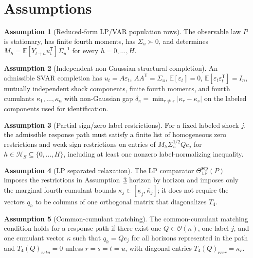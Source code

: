 \documentclass[11pt]{article}
\newcommand{\E}{\mathbb{E}}
\newcommand{\transpose}{\mathsf{T}}
\theoremstyle{definition}
\newtheorem{assumption}{Assumption}
\theoremstyle{plain}
\theoremstyle{remark}
\begin{document}
\section{Assumptions}
\begin{assumption}[Reduced-form LP/VAR population rows]\label{ass:rf-rows}
The observable law \(P\) is stationary, has finite fourth moments, has \(\Sigma_u\succ0\), and determines \(M_h=\E[Y_{t+h}u_t^\transpose]\Sigma_u^{-1}\) for every \(h=0,\ldots,H\).
\end{assumption}

\begin{assumption}[Independent non-Gaussian structural completion]\label{ass:ng-completion}
An admissible SVAR completion has \(u_t=A\varepsilon_t\), \(AA^\transpose=\Sigma_u\), \(\E[\varepsilon_t]=0\), \(\E[\varepsilon_t\varepsilon_t^\transpose]=I_n\), mutually independent shock components, finite fourth moments, and fourth cumulants \(\kappa_1,\ldots,\kappa_n\) with non-Gaussian gap \(\delta_\kappa=\min_{r\ne s}|\kappa_r-\kappa_s|\) on the labeled components used for identification.
\end{assumption}

\begin{assumption}[Partial sign/zero label restrictions]\label{ass:sign-zero}
For a fixed labeled shock \(j\), the admissible response path must satisfy a finite list of homogeneous zero restrictions and weak sign restrictions on entries of \(M_h\Sigma_u^{1/2}Qe_j\) for \(h\in\mathcal H_S\subseteq\{0,\ldots,H\}\), including at least one nonzero label-normalizing inequality.
\end{assumption}

\begin{assumption}[LP separated relaxation]\label{ass:lp-sep}
The LP comparator \(\Theta_{\mathrm{LP}}^{\mathrm{sep}}(P)\) imposes the restrictions in Assumption~\ref{ass:sign-zero} horizon by horizon and imposes only the marginal fourth-cumulant bounds \(\kappa_j\in[\underline\kappa_j,\overline\kappa_j]\); it does not require the vectors \(q_h\) to be columns of one orthogonal matrix that diagonalizes \(T_4\).
\end{assumption}

\begin{assumption}[Common-cumulant matching]\label{ass:cumulant-match}
The common-cumulant matching condition holds for a response path if there exist one \(Q\in\mathcal O(n)\), one label \(j\), and one cumulant vector \(\kappa\) such that \(q_h=Qe_j\) for all horizons represented in the path and \(T_4(Q)_{rstu}=0\) unless \(r=s=t=u\), with diagonal entries \(T_4(Q)_{rrrr}=\kappa_r\).
\end{assumption}
\end{document}

